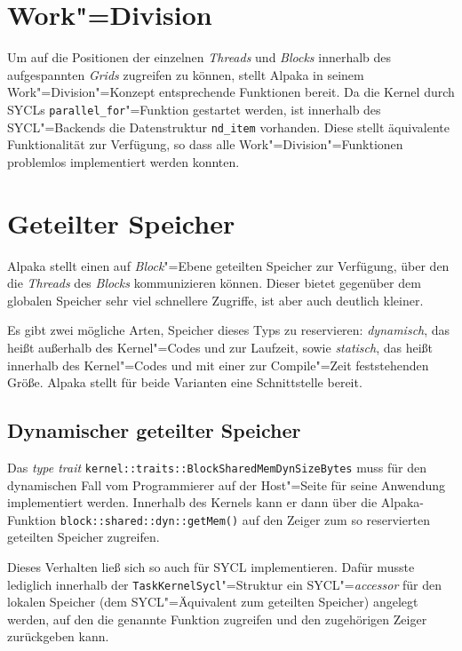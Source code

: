 \section{Work"=Division}
\label{implementierung:workDiv}

Um auf die Positionen der einzelnen \textit{Threads} und \textit{Blocks}
innerhalb des aufgespannten \textit{Grids} zugreifen zu können, stellt Alpaka
in seinem Work"=Division"=Konzept entsprechende Funktionen bereit. Da die Kernel
durch SYCLs \texttt{parallel\_for}"=Funktion gestartet werden, ist innerhalb
des SYCL"=Backends die Datenstruktur \texttt{nd\_item} vorhanden. Diese stellt
äquivalente Funktionalität zur Verfügung, so dass alle
Work"=Division"=Funktionen problemlos implementiert werden konnten.

\section{Geteilter Speicher}
\label{implementierung:shared}

Alpaka stellt einen auf \textit{Block}"=Ebene geteilten Speicher zur Verfügung,
über den die \textit{Threads} des \textit{Blocks} kommunizieren können. Dieser
bietet gegenüber dem globalen Speicher sehr viel schnellere Zugriffe, ist aber
auch deutlich kleiner. 

Es gibt zwei mögliche Arten, Speicher dieses Typs zu reservieren:
\textit{dynamisch}, das heißt außerhalb des Kernel"=Codes und zur Laufzeit,
sowie \textit{statisch}, das heißt innerhalb des Kernel"=Codes und mit einer zur
Compile"=Zeit feststehenden Größe. Alpaka stellt für beide Varianten eine
Schnittstelle bereit.

\subsection{Dynamischer geteilter Speicher}

Das \textit{type trait} \texttt{kernel::traits::BlockSharedMemDynSizeBytes}
muss für den dynamischen Fall vom Programmierer auf der Host"=Seite für seine
Anwendung implementiert werden. Innerhalb des Kernels kann er dann über die
Alpaka-Funktion \texttt{block::shared::dyn::getMem()} auf den Zeiger zum so
reservierten geteilten Speicher zugreifen.

Dieses Verhalten ließ sich so auch für SYCL implementieren. Dafür musste
lediglich innerhalb der \texttt{TaskKernelSycl}"=Struktur ein
SYCL"=\textit{accessor} für den lokalen Speicher (dem SYCL"=Äquivalent zum
geteilten Speicher) angelegt werden, auf den die genannte Funktion zugreifen und
den zugehörigen Zeiger zurückgeben kann.

